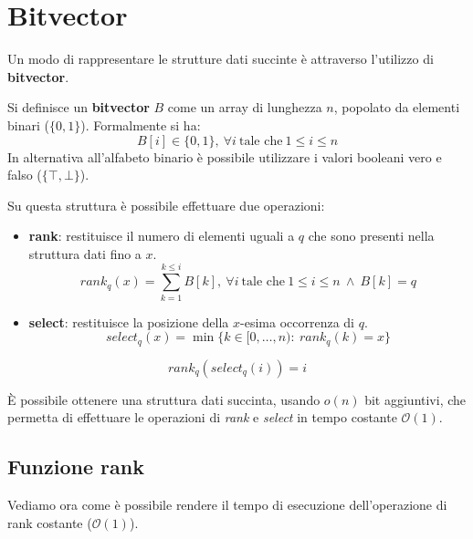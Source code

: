 \section{Bitvector}
Un modo di rappresentare le strutture dati succinte è attraverso l'utilizzo di
\textbf{bitvector}.
\begin{definizione}
    Si definisce un \textbf{bitvector} $B$ come un array di lunghezza $n$, popolato
    da elementi binari ($\{0, 1\}$). Formalmente si ha:
    \begin{equation}
        B[i] \in \{0, 1\}, \ \forall i \ \text{tale che} \ 1 \leq i \leq n
    \end{equation}
    In alternativa all'alfabeto binario è possibile utilizzare i valori booleani
    vero e falso ($\{\top, \bot\}$).
\end{definizione}
Su questa struttura è possibile effettuare due operazioni:
\begin{itemize}
    \item \textbf{rank}: restituisce il numero di elementi uguali a $q$ che sono
          presenti nella struttura dati fino a $x$.
          \begin{equation}
              rank_q(x) = \sum_{k = 1}^{k \leq i} B[k], \ \forall i \
              \text{tale che} \ 1 \leq i \leq n \ \land \ B[k] = q
          \end{equation}
    \item \textbf{select}: restituisce la posizione della $x$-esima occorrenza
          di $q$.
          \begin{equation}
              select_q(x) = \min{\{k \in [0, \dots, n): \ rank_q(k) = x\}}
          \end{equation}
\end{itemize}
\begin{nota}
    \begin{equation}
        rank_q(select_q(i)) = i
    \end{equation}
\end{nota}
È possibile ottenere una struttura dati succinta, usando $o(n)$ bit aggiuntivi,
che permetta di effettuare le operazioni di \textit{rank} e \textit{select} in
tempo costante $\mathcal{O}(1)$.
\subsection{Funzione rank}
Vediamo ora come è possibile rendere il tempo di esecuzione dell'operazione di
rank costante ($\mathcal{O}(1)$).

